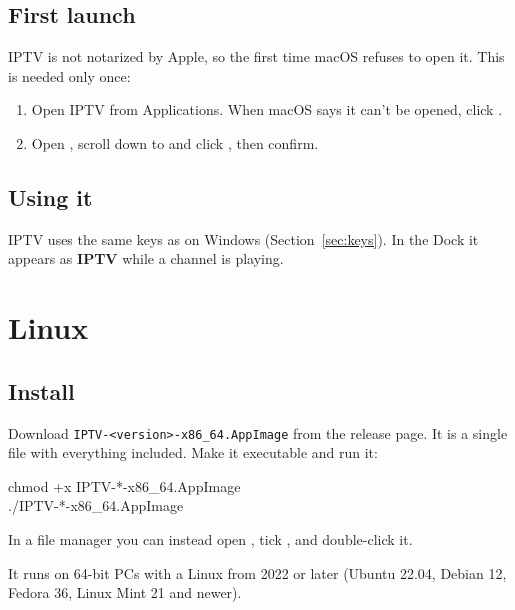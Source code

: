 \subsection{First launch}
IPTV is not notarized by Apple, so the first time macOS refuses to open it.
This is needed only once:
\begin{enumerate}
  \item Open IPTV from Applications. When macOS says it can't be opened,
        click .
  \item Open ,
        scroll down to  and click
        , then confirm.
\end{enumerate}

\subsection{Using it}
IPTV uses the same keys as on Windows (Section~\ref{sec:keys}). In the Dock
it appears as \textbf{IPTV} while a channel is playing.


\section{Linux}

\subsection{Install}
Download \texttt{IPTV-\textless version\textgreater-x86\_64.AppImage} from the
release page. It is a single file with everything included. Make it
executable and run it:
\begin{center}
\begin{minipage}{0.8\linewidth}
\small\ttfamily chmod +x IPTV-*-x86\_64.AppImage\\
./IPTV-*-x86\_64.AppImage
\end{minipage}
\end{center}
In a file manager you can instead open , tick , and double-click it.

It runs on 64-bit PCs with a Linux from 2022 or later (Ubuntu 22.04, Debian
12, Fedora 36, Linux Mint 21 and newer).

